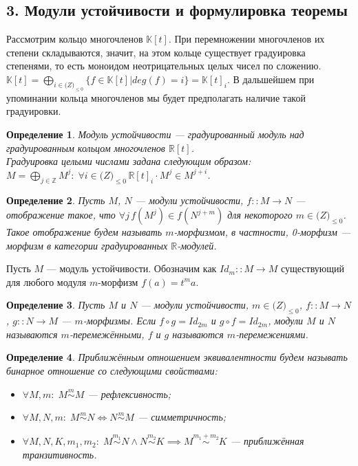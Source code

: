 \documentclass[a4paper,12pt]{report}
\newtheorem{definition}{Определение}
\begin{document}
\subsection*{3. Модули устойчивости и формулировка теоремы}
Рассмотрим кольцо многочленов $\mathbb{K}[t]$. При перемножении многочленов их степени складываются, значит, на этом кольце существует градуировка степенями, то есть моноидом неотрицательных целых чисел по сложению. $\mathbb{K}[t] = \bigoplus_{i \in \mathbb(Z)_{\leq 0}} \{f \in \mathbb{K}[t] | deg(f) = i\} = \mathbb{K}[t]_i$. В дальшейшем при упоминании кольца многочленов мы будет предполагать наличие такой градуировки.\\
\begin{definition}
  Модуль устойчивости --- градуированный модуль над градуированным кольцом многочленов $\mathbb{R}[t]$.\\
  Градуировка целыми числами задана следующим образом: $M = \bigoplus_{j \in \mathbb{Z}} M^j:\; \forall i \in \mathbb(Z)_{\leq 0}\, \mathbb{R}[t]_i \cdot M^j \in M^{j+i}$.
\end{definition}
\begin{definition}
  Пусть $M$, $N$ --- модули устойчивости, $f :: M \to N$ --- отображение такое, что $\forall j\, f(M^j) \in f(N^{j+m})$ для некоторого $m \in \mathbb(Z)_{\leq 0}$. Такое отображение будем называть $m$-морфизмом, в частности, 0-морфизм --- морфизм в категории градуированных $\mathbb{R}$-модулей.
\end{definition}
Пусть $M$ --- модуль устойчивости. Обозначим как $Id_m :: M \to M$ существующий для любого модуля $m$-морфизм $f(a) = t^ma$.\\
\begin{definition}
  Пусть $M$ и $N$ --- модули устойчивости, $m \in \mathbb(Z)_{\leq 0}$, $f :: M \to N$, $g :: N \to M$ --- $m$-морфизмы. Если $f \circ g = Id_{2m}$ и $g \circ f = Id_{2m}$, модули $M$ и $N$ называются $m$-перемежёнными, $f$ и $g$ называются $m$-перемежениями.
\end{definition}
\begin{definition}
  Приближённым отношением эквивалентности будем называть бинарное отношение со следующими свойствами:
  \begin{itemize}
    \item $\forall M,m:\; M \stackrel{m}{\sim} M$ --- рефлексивность;\\
    \item $\forall M,N,m:\; M \stackrel{m}{\sim} N \iff N \stackrel{m}{\sim} M$ --- симметричность;\\
    \item $\forall M,N,K,m_1,m_2:\; M \stackrel{m_1}{\sim} N \land N \stackrel{m_2}{\sim} K \implies M \stackrel{m_1 + m_2}{\sim} K$ --- приближённая транзитивность.\\
  \end{itemize}
\end{definition}
\end{document}

